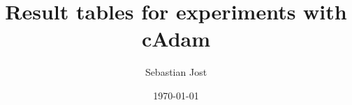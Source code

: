 \documentclass[DIV=13,10pt]{scrartcl}
\title{Result tables for experiments with cAdam}
\author{Sebastian Jost}
\date{\today}
\begin{document}
\sffamily
% 
\tableofcontents
\begin{landscape}


\end{landscape}
\end{document}
